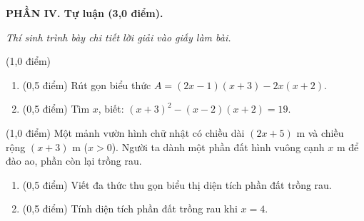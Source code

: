 \documentclass[11pt,a4paper]{article}
\begin{document}
\vspace{1mm}
\noindent\textbf{\large PHẦN IV. Tự luận (3,0 điểm).}

\textit{Thí sinh trình bày chi tiết lời giải vào giấy làm bài.}

\begin{ex} (1,0 điểm)
\begin{enumerate}[label=\textbf{\alph*)}, leftmargin=0.8cm, itemsep=1.5pt]
  \item (0,5 điểm) Rút gọn biểu thức $A = (2x - 1)(x + 3) - 2x(x + 2)$.
  \item (0,5 điểm) Tìm $x$, biết: $(x + 3)^2 - (x - 2)(x + 2) = 19$.
\end{enumerate}
\end{ex}

\begin{ex} (1,0 điểm)
Một mảnh vườn hình chữ nhật có chiều dài $(2x + 5)\text{ m}$ và chiều rộng $(x + 3)\text{ m}$ ($x > 0$). Người ta dành một phần đất hình vuông cạnh $x\text{ m}$ để đào ao, phần còn lại trồng rau.
\begin{enumerate}[label=\textbf{\alph*)}, leftmargin=0.8cm, itemsep=1.5pt]
  \item (0,5 điểm) Viết đa thức thu gọn biểu thị diện tích phần đất trồng rau.
  \item (0,5 điểm) Tính diện tích phần đất trồng rau khi $x = 4$.
\end{enumerate}
\end{ex}
\end{document}

